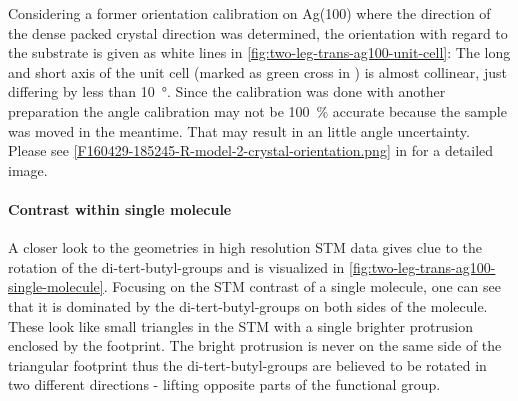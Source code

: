 	Considering a former orientation calibration on Ag(100) where the direction of the dense packed crystal direction was determined, the orientation with regard to the substrate is given as white lines in \autoref{fig:two-leg-trans-ag100-unit-cell}: The long and short axis of the unit cell (marked as green cross in ) is almost collinear, just differing by less than \SI{10}{\degree}. Since the calibration was done with another preparation the angle calibration may not be \SI{100}{\percent} accurate because the sample was moved in the meantime. That may result in an little angle uncertainty. Please see  \autoref{F160429-185245-R-model-2-crystal-orientation.png} in  for a detailed image.
	
	\paragraph{Contrast within single molecule}
	A closer look to the geometries in high resolution STM data gives clue to the rotation of the di-tert-butyl-groups and is visualized in \autoref{fig:two-leg-trans-ag100-single-molecule}. Focusing on the STM contrast of a single molecule, one can see that it is dominated by the di-tert-butyl-groups on both sides of the molecule. These look like small triangles in the STM with a single brighter protrusion enclosed by the footprint. The bright protrusion is never on the same side of the triangular footprint thus the di-tert-butyl-groups are believed to be rotated in two different directions - lifting opposite parts of the functional group.
